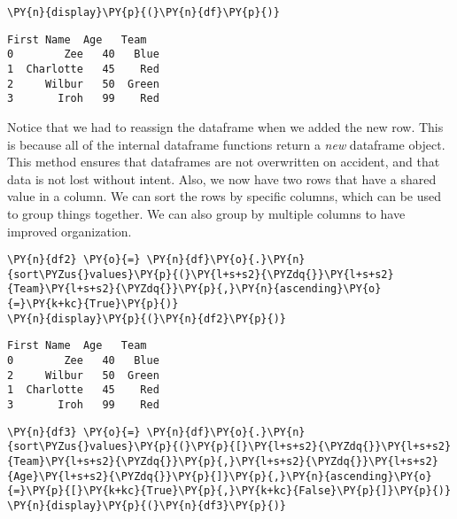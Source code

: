     \begin{tcolorbox}[breakable, size=fbox, boxrule=1pt, pad at break*=1mm,colback=cellbackground, colframe=cellborder]
\begin{Verbatim}[commandchars=\\\{\}]
\PY{n}{display}\PY{p}{(}\PY{n}{df}\PY{p}{)}
\end{Verbatim}
\end{tcolorbox}

    
    \begin{Verbatim}[commandchars=\\\{\}]
  First Name  Age   Team
0        Zee   40   Blue
1  Charlotte   45    Red
2     Wilbur   50  Green
3       Iroh   99    Red
    \end{Verbatim}

    
    Notice that we had to reassign the dataframe when we added the new row.
This is because all of the internal dataframe functions return a
\emph{new} dataframe object. This method ensures that dataframes are not
overwritten on accident, and that data is not lost without intent. Also,
we now have two rows that have a shared value in a column. We can sort
the rows by specific columns, which can be used to group things
together. We can also group by multiple columns to have improved
organization.

    \begin{tcolorbox}[breakable, size=fbox, boxrule=1pt, pad at break*=1mm,colback=cellbackground, colframe=cellborder]
\begin{Verbatim}[commandchars=\\\{\}]
\PY{n}{df2} \PY{o}{=} \PY{n}{df}\PY{o}{.}\PY{n}{sort\PYZus{}values}\PY{p}{(}\PY{l+s+s2}{\PYZdq{}}\PY{l+s+s2}{Team}\PY{l+s+s2}{\PYZdq{}}\PY{p}{,}\PY{n}{ascending}\PY{o}{=}\PY{k+kc}{True}\PY{p}{)}
\PY{n}{display}\PY{p}{(}\PY{n}{df2}\PY{p}{)}
\end{Verbatim}
\end{tcolorbox}

    
    \begin{Verbatim}[commandchars=\\\{\}]
  First Name  Age   Team
0        Zee   40   Blue
2     Wilbur   50  Green
1  Charlotte   45    Red
3       Iroh   99    Red
    \end{Verbatim}

    
    \begin{tcolorbox}[breakable, size=fbox, boxrule=1pt, pad at break*=1mm,colback=cellbackground, colframe=cellborder]
\begin{Verbatim}[commandchars=\\\{\}]
\PY{n}{df3} \PY{o}{=} \PY{n}{df}\PY{o}{.}\PY{n}{sort\PYZus{}values}\PY{p}{(}\PY{p}{[}\PY{l+s+s2}{\PYZdq{}}\PY{l+s+s2}{Team}\PY{l+s+s2}{\PYZdq{}}\PY{p}{,}\PY{l+s+s2}{\PYZdq{}}\PY{l+s+s2}{Age}\PY{l+s+s2}{\PYZdq{}}\PY{p}{]}\PY{p}{,}\PY{n}{ascending}\PY{o}{=}\PY{p}{[}\PY{k+kc}{True}\PY{p}{,}\PY{k+kc}{False}\PY{p}{]}\PY{p}{)}
\PY{n}{display}\PY{p}{(}\PY{n}{df3}\PY{p}{)}
\end{Verbatim}
\end{tcolorbox}

